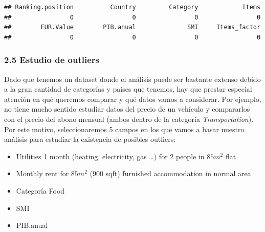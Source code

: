 \documentclass[
]{article}
\newenvironment{Shaded}{\begin{snugshade}}{\end{snugshade}}
\newcommand{\AttributeTok}[1]{\textcolor[rgb]{0.13,0.29,0.53}{#1}}
\newcommand{\CommentTok}[1]{\textcolor[rgb]{0.56,0.35,0.01}{\textit{#1}}}
\newcommand{\DecValTok}[1]{\textcolor[rgb]{0.00,0.00,0.81}{#1}}
\newcommand{\FunctionTok}[1]{\textcolor[rgb]{0.13,0.29,0.53}{\textbf{#1}}}
\newcommand{\NormalTok}[1]{#1}
\newcommand{\OtherTok}[1]{\textcolor[rgb]{0.56,0.35,0.01}{#1}}
\newcommand{\SpecialCharTok}[1]{\textcolor[rgb]{0.81,0.36,0.00}{\textbf{#1}}}
\newcommand{\StringTok}[1]{\textcolor[rgb]{0.31,0.60,0.02}{#1}}
\providecommand{\tightlist}{%
  \setlength{\itemsep}{0pt}\setlength{\parskip}{0pt}}
\begin{document}
\begin{verbatim}
## Ranking.position          Country         Category            Items 
##                0                0                0                0 
##        EUR.Value        PIB.anual              SMI     Items_factor 
##                0                0                0                0
\end{verbatim}

\hypertarget{estudio-de-outliers}{%
\subsubsection{2.5 Estudio de outliers}\label{estudio-de-outliers}}

Dado que tenemos un dataset donde el análisis puede ser bastante extenso
debido a la gran cantidad de categorías y países que tenemos, hay que
prestar especial atención en qué queremos comparar y qué datos vamos a
considerar. Por ejemplo, no tiene mucho sentido estudiar datos del
precio de un vehículo y compararlos con el precio del abono mensual
(ambos dentro de la categoría \emph{Transportation}). Por este motivo,
seleccionaremos 5 campos en los que vamos a basar nuestro análisis para
estudiar la existencia de posibles outliers:

\begin{itemize}
\tightlist
\item
  Utilities 1 month (heating, electricity, gas \ldots) for 2 people in
  \(85m^{2}\) flat
\item
  Monthly rent for \(85 m^{2}\) (900 sqft) furnished accommodation in
  normal area
\item
  Categoría Food
\item
  SMI
\item
  PIB.anual
\end{itemize}

\begin{Shaded}
\end{Shaded}
\end{document}
